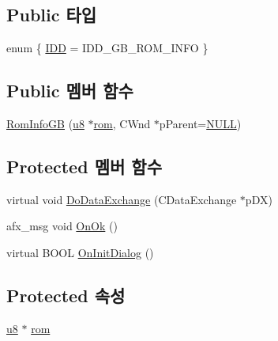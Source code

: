 \subsection*{Public 타입}
\begin{DoxyCompactItemize}
\item 
enum \{ \mbox{\hyperlink{class_rom_info_g_b_a064c2e7a699087424ed18892356145f5aa168de60cf7ad6f99a78e4e9ffb7409c}{I\+DD}} = I\+D\+D\+\_\+\+G\+B\+\_\+\+R\+O\+M\+\_\+\+I\+N\+FO
 \}
\end{DoxyCompactItemize}
\subsection*{Public 멤버 함수}
\begin{DoxyCompactItemize}
\item 
\mbox{\hyperlink{class_rom_info_g_b_a89d8213c4f8c05b76fdf395757a51cef}{Rom\+Info\+GB}} (\mbox{\hyperlink{_system_8h_aed742c436da53c1080638ce6ef7d13de}{u8}} $\ast$\mbox{\hyperlink{class_rom_info_g_b_ab7ac87e9a9566fce1f057d7c37f60770}{rom}}, C\+Wnd $\ast$p\+Parent=\mbox{\hyperlink{_system_8h_a070d2ce7b6bb7e5c05602aa8c308d0c4}{N\+U\+LL}})
\end{DoxyCompactItemize}
\subsection*{Protected 멤버 함수}
\begin{DoxyCompactItemize}
\item 
virtual void \mbox{\hyperlink{class_rom_info_g_b_aff85d9d0011b4b73cdf3ed85ecf64ff8}{Do\+Data\+Exchange}} (C\+Data\+Exchange $\ast$p\+DX)
\item 
afx\+\_\+msg void \mbox{\hyperlink{class_rom_info_g_b_a1d2f685c9b4215ff9dae328e90777312}{On\+Ok}} ()
\item 
virtual B\+O\+OL \mbox{\hyperlink{class_rom_info_g_b_a91b078804aeeca8f6bc23479b1b3e839}{On\+Init\+Dialog}} ()
\end{DoxyCompactItemize}
\subsection*{Protected 속성}
\begin{DoxyCompactItemize}
\item 
\mbox{\hyperlink{_system_8h_aed742c436da53c1080638ce6ef7d13de}{u8}} $\ast$ \mbox{\hyperlink{class_rom_info_g_b_ab7ac87e9a9566fce1f057d7c37f60770}{rom}}
\end{DoxyCompactItemize}



